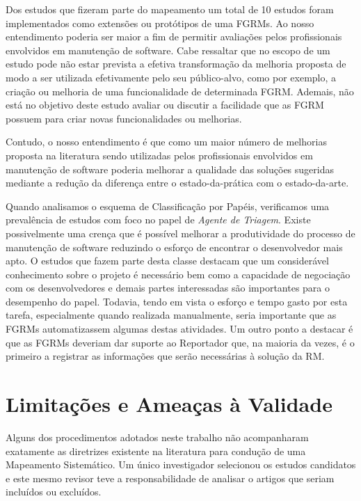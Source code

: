 Dos estudos que fizeram parte do mapeamento um total de 10 estudos foram
implementados como extensões ou protótipos de uma FGRMs. Ao nosso entendimento
poderia ser maior a fim de permitir avaliações pelos profissionais envolvidos em
manutenção de software. Cabe ressaltar que no escopo de um estudo pode não estar
prevista a efetiva transformação da melhoria proposta de modo a ser utilizada
efetivamente pelo seu público-alvo, como por exemplo, a criação ou melhoria de
uma funcionalidade de determinada FGRM\@. Ademais, não está no objetivo deste
estudo avaliar ou discutir a facilidade que as FGRM possuem para criar novas
funcionalidades ou melhorias.

Contudo, o nosso entendimento é que como um maior número de melhorias proposta
na literatura sendo utilizadas pelos profissionais envolvidos em manutenção de
software poderia melhorar a qualidade das soluções sugeridas mediante a redução
da diferença entre o estado-da-prática com o estado-da-arte.

Quando analisamos o esquema de Classificação por Papéis, verificamos uma
prevalência de estudos com foco no papel de \textit{Agente de Triagem}. Existe
possivelmente uma crença que é possível melhorar a produtividade do processo de
manutenção de software reduzindo o esforço de encontrar o desenvolvedor mais
apto. O estudos que fazem parte desta classe destacam que um considerável
conhecimento sobre o projeto é necessário bem como a capacidade de negociação
com os desenvolvedores e demais partes interessadas são importantes para o
desempenho do papel. Todavia, tendo em vista o esforço e tempo gasto por esta
tarefa, especialmente quando realizada manualmente, seria importante que as
FGRMs automatizassem algumas destas atividades. Um outro ponto a destacar é que
as FGRMs deveriam dar suporte ao Reportador que, na maioria da vezes, é o
primeiro a registrar as informações que serão necessárias à solução da RM\@.

\section{Limitações e Ameaças à Validade}
\label{sec:map_limitacoes_ameacas}

Alguns dos procedimentos adotados neste trabalho não acompanharam exatamente as
diretrizes existente na literatura para condução de uma Mapeamento Sistemático.
Um único investigador selecionou os estudos candidatos e este mesmo revisor teve
a responsabilidade de analisar o artigos que seriam incluídos ou excluídos.

